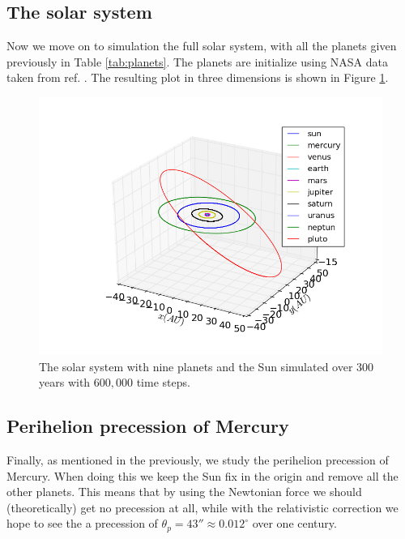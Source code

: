 \documentclass[12pt, a4paper]{article}
\begin{document}
\subsection{The solar system}

Now we move on to simulation the full solar system, with all the planets given previously in Table 
\ref{tab:planets}. The planets are initialize using NASA data taken from ref. \cite{NASA}.  
The resulting plot in three dimensions is shown in Figure \ref{fig:solarsystem}.

\begin{figure}[ht!]
\begin{center}
\includegraphics[width=\textwidth]{../Programs/Output/SolarSystem_3D.png}
\caption{The solar system with nine planets and the Sun simulated over $300$ years with $600,000$ time 
steps.}
\label{fig:solarsystem}
\end{center}
\end{figure}

\subsection{Perihelion precession of Mercury}

Finally, as mentioned in the previously, we study the perihelion precession of Mercury. When doing this
we keep the Sun fix in the origin and remove all the other planets. This means that by using the 
Newtonian force we should (theoretically) get no precession at all, while with the relativistic 
correction we hope to see the a precession of $\theta_p=43''\approx 0.012^{\circ}$ over one century.
\end{document}

